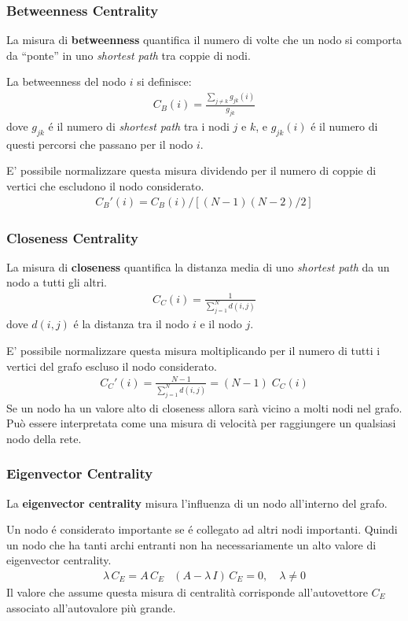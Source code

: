 \subsubsection*{Betweenness Centrality}
La misura di \textbf{betweenness} quantifica il numero di volte che un nodo si comporta da ``ponte'' in uno \textit{shortest path} tra coppie di nodi. 

La betweenness del nodo $i$ si definisce:
\begin{align*}
  C_B(i) = \frac{\sum_{j\not=k} g_{jk}(i)}{g_{jk}}
\end{align*}
dove $g_{jk}$ é il numero di \textit{shortest path} tra i nodi $j$ e $k$, e $g_{jk}(i)$ é il numero di questi percorsi che passano per il nodo $i$.

E' possibile normalizzare questa misura dividendo per il numero di coppie di vertici che escludono il nodo considerato.
\begin{align*}
  C_B'(i) = C_B(i) / [(N-1)(N-2)/2] 
\end{align*}

\subsubsection*{Closeness Centrality}
La misura di \textbf{closeness} quantifica la distanza media di uno \textit{shortest path} da un nodo a tutti gli altri.
\begin{align*}
  C_C(i) = \frac{1}{\sum_{j=1}^N d(i, j)}
\end{align*}
dove $d(i,j)$ é la distanza tra il nodo $i$ e il nodo $j$.

E' possibile normalizzare questa misura moltiplicando per il numero di tutti i vertici del grafo escluso il nodo considerato.
\begin{align*}
  C_C'(i) = \frac{N - 1}{\sum_{j=1}^N d(i, j)} = (N-1) \; C_C(i)
\end{align*}
%
Se un nodo ha un valore alto di closeness allora sarà vicino a molti nodi nel grafo.
Può essere interpretata come una misura di velocità per raggiungere un qualsiasi nodo della rete.

\subsubsection*{Eigenvector Centrality}
La \textbf{eigenvector centrality} misura l'influenza di un nodo all'interno del grafo.

Un nodo é considerato importante se é collegato ad altri nodi importanti.
Quindi un nodo che ha tanti archi entranti non ha necessariamente un alto valore di eigenvector centrality.
%
\begin{align*}
  & \lambda\,C_E = A\,C_E & (A - \lambda\,I)\,C_E = 0,\quad \lambda \not= 0 &
\end{align*}
%
Il valore che assume questa misura di centralità corrisponde all'autovettore $C_E$ associato all'autovalore più grande.

